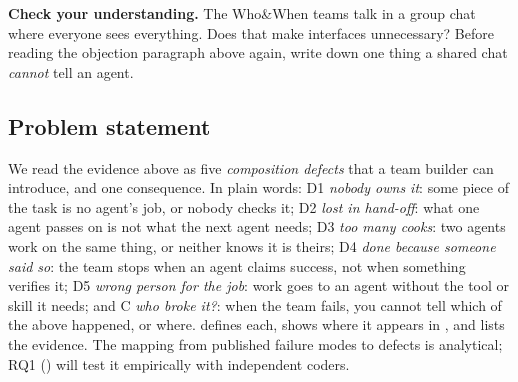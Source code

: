 \documentclass[10pt,a4paper]{article}
\newcommand{\D}[1]{\textsf{D#1}}
\newenvironment{think}[1][Check your understanding]{%
  \begin{tcolorbox}[enhanced, colback=thinkbg, colframe=thinkbg, arc=0pt, boxrule=0pt,
     borderline west={2.2pt}{0pt}{thinkbar}, left=8pt, right=8pt, top=5pt, bottom=5pt,
     before skip=8pt, after skip=8pt]
  \textsf{\bfseries\color{thinkbar}#1.}\enspace}{\end{tcolorbox}}
\begin{document}
\begin{think}
The Who\&When teams talk in a group chat where everyone sees everything.
Does that make interfaces unnecessary? Before reading the objection
paragraph above again, write down one thing a shared chat \emph{cannot}
tell an agent.
\end{think}

\subsection{Problem statement}\label{sec:statement}

We read the evidence above as five \emph{composition defects} that a team
builder can introduce, and one consequence. In plain words:
\D{1} \emph{nobody owns it}: some piece of the task is no agent's job, or
nobody checks it;
\D{2} \emph{lost in hand-off}: what one agent passes on is not what the
next agent needs;
\D{3} \emph{too many cooks}: two agents work on the same thing, or neither
knows it is theirs;
\D{4} \emph{done because someone said so}: the team stops when an agent
claims success, not when something verifies it;
\D{5} \emph{wrong person for the job}: work goes to an agent without the
tool or skill it needs; and
C \emph{who broke it?}: when the team fails, you cannot tell which of the
above happened, or where.  defines
each, shows where it appears in , and lists the evidence.
The mapping from published failure modes to defects is analytical; RQ1
() will test it empirically with independent coders.
\end{document}
